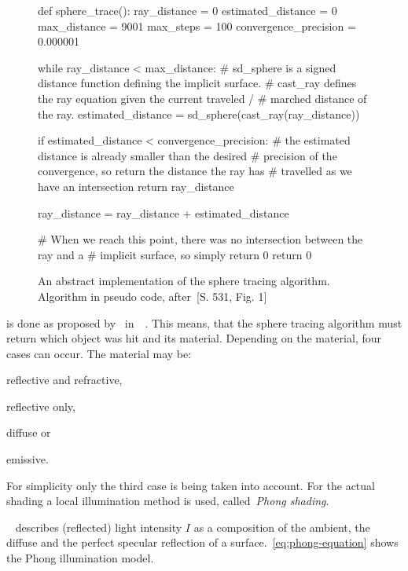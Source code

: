 \documentclass[%
    a4paper,    %
    justified,  %
    nobib,      %
    openany     %
]{tufte-book}
\makeatletter
\renewcommand{\label}[1]{\@tufte@label{##1}}%
\makeatother
\begin{document}
\begin{figure}
  \begin{pythoncode}
def sphere_trace():
    ray_distance          = 0
    estimated_distance    = 0
    max_distance          = 9001
    max_steps             = 100
    convergence_precision = 0.000001

    while ray_distance < max_distance:
        # sd_sphere is a signed distance function defining the implicit surface.
        # cast_ray defines the ray equation given the current traveled /
        # marched distance of the ray.
        estimated_distance = sd_sphere(cast_ray(ray_distance))

        if estimated_distance < convergence_precision:
            # the estimated distance is already smaller than the desired
            # precision of the convergence, so return the distance the ray has
            # travelled as we have an intersection
            return ray_distance

        ray_distance = ray_distance + estimated_distance

    # When we reach this point, there was no intersection between the ray and a
    # implicit surface, so simply return 0
    return 0
  \end{pythoncode}
  \caption{%
    An abstract implementation of the sphere tracing algorithm. Algorithm in
    pseudo code, after~\cite{hart_sphere_1994}[S. 531, Fig. 1]
  }
\label{alg:sphere-tracing}
\end{figure}

 is done as proposed by~
in~~\cite{whitted_improved_1980}. This means,
that the sphere tracing algorithm must return which object was hit and its material.
Depending on the material, four cases can occur. The material may be:
\begin{enumerate*}
  \item reflective and refractive,
  \item reflective only,
  \item diffuse or
  \item emissive.
\end{enumerate*}
For simplicity only the third case is being taken into account. For the actual
shading a local illumination method is used, called~\emph{Phong shading}.

\newpage{}

~\cite[p. 123]{foley_computer_1996} describes (reflected) light intensity
$I$ as a composition of the ambient, the diffuse and the perfect specular
reflection of a surface.~\autoref{eq:phong-equation} shows the Phong
illumination model.
\end{document}
